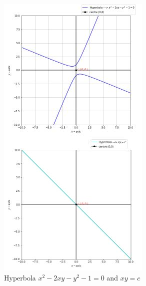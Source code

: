 \documentclass[journal,12pt,twocolumn]{IEEEtran}
\begin{document}
\begin{figure}[!htb]
	
	
	\includegraphics[width=\columnwidth]{Assignment5_2.jpg}
	
	\caption{Hyperbola $x^2-2xy-y^2-1=0$ and $xy =c$}
	
	\label{fig:1}
	
\end{figure}
\end{document}
